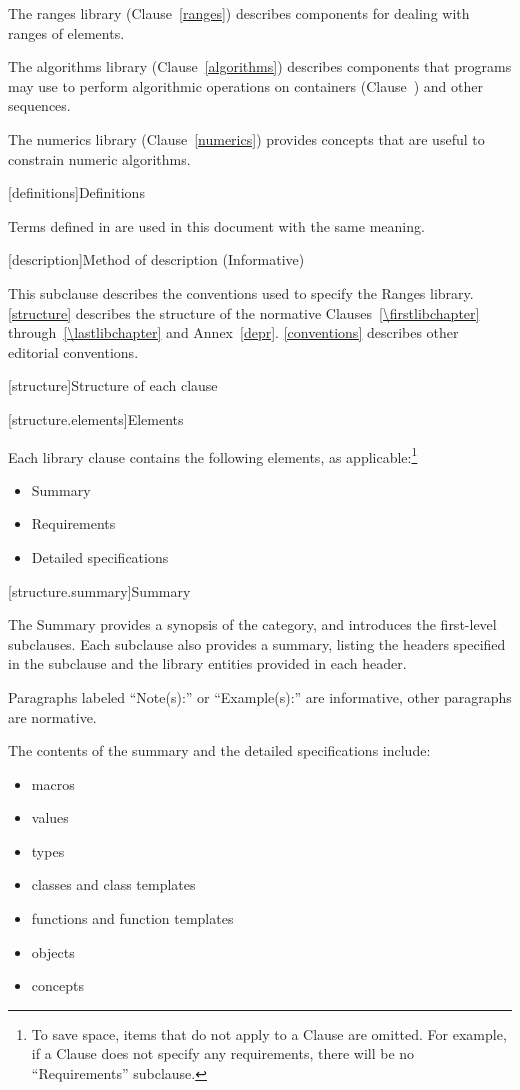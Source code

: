 \pnum
The ranges library (Clause~\ref{ranges}) describes components for dealing with
ranges of elements.

\pnum
The algorithms library (Clause~\ref{algorithms}) describes components that \Cpp
programs may use to perform algorithmic operations on containers
(Clause~) and other sequences.

\pnum
The numerics library (Clause~\ref{numerics}) provides concepts that are useful
to constrain numeric algorithms.

[definitions]{Definitions}

\pnum
Terms defined in  are used in this document with the same
meaning.

[description]{Method of description (Informative)}

\pnum
This subclause describes the conventions used to specify the Ranges
library. \ref{structure} describes the structure of the normative
Clauses~\ref{\firstlibchapter} through~\ref{\lastlibchapter} and
Annex~\ref{depr}. \ref{conventions} describes other editorial conventions.

[structure]{Structure of each clause}

[structure.elements]{Elements}

\pnum
Each library clause contains the following elements, as applicable:\footnote{To
save space, items that do not apply to a Clause are omitted.
For example, if a Clause does not specify any requirements,
there will be no ``Requirements'' subclause.}

\begin{itemize}
\item Summary
\item Requirements
\item Detailed specifications
\end{itemize}

[structure.summary]{Summary}

\pnum
The Summary provides a synopsis of the category, and introduces the first-level subclauses.
Each subclause also provides a summary, listing the headers specified in the
subclause and the library entities provided in each header.

\pnum
Paragraphs labeled ``Note(s):'' or ``Example(s):'' are informative, other paragraphs
are normative.

\pnum
The contents of the summary and the detailed specifications include:

\begin{itemize}
\item macros
\item values
\item types
\item classes and class templates
\item functions and function templates
\item objects
\item concepts
\end{itemize}


